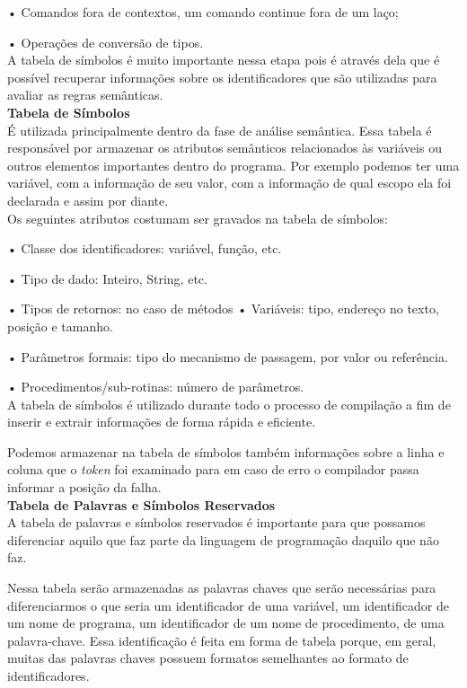 \documentclass{article}
\begin{document}
•	Comandos fora de contextos, um comando continue fora de um laço;

•	Operações de conversão de tipos.
\\

A tabela de símbolos é muito importante nessa etapa pois é através dela que é possível recuperar informações sobre os identificadores que são utilizadas para avaliar as regras semânticas.
\\

\textbf{Tabela de Símbolos}
\\

É utilizada principalmente dentro da fase de análise semântica. Essa tabela é responsável por armazenar os atributos semânticos relacionados às variáveis ou outros elementos importantes dentro do programa. Por exemplo podemos ter uma variável, com a informação de seu valor, com a informação de qual escopo ela foi declarada e assim por diante. 
\\

Os seguintes atributos costumam ser gravados na tabela de símbolos:

•	Classe dos identificadores: variável, função, etc.

•	Tipo de dado: Inteiro, String, etc.

•	Tipos de retornos: no caso de métodos
•	Variáveis: tipo, endereço no texto, posição e tamanho.

•	Parâmetros formais: tipo do mecanismo de passagem, por valor ou referência.

•	Procedimentos/sub-rotinas: número de parâmetros.
\\

A tabela de símbolos é utilizado durante todo o processo de compilação a fim de inserir e extrair informações de forma rápida e eficiente.

Podemos armazenar na tabela de símbolos também informações sobre a linha e coluna que o \textit{token} foi examinado para em caso de erro o compilador passa informar a posição da falha.
\\

\textbf{Tabela de Palavras e Símbolos Reservados}
\\

A tabela de palavras e símbolos reservados é importante para que possamos diferenciar aquilo que faz parte da linguagem de programação daquilo que não faz. 

Nessa tabela serão armazenadas as palavras chaves que serão necessárias para diferenciarmos o que seria um identificador de uma variável, um identificador de um nome de programa, um identificador de um nome de procedimento, de uma palavra-chave. Essa identificação é feita em forma de tabela porque, em geral, muitas das palavras chaves possuem formatos semelhantes ao formato de identificadores. 
\\
\end{document}
